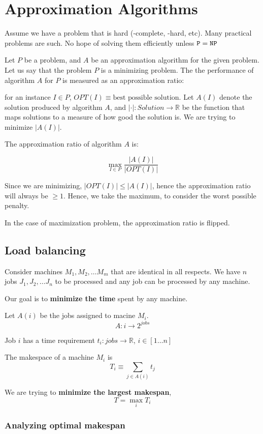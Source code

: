 \chapter{Approximation Algorithms}

Assume we have a problem that is hard (\nptime-complete, \nptime-hard, etc). Many practical
problems are such. No hope of solving them efficiently unless $\texttt{P} = \texttt{NP}$

Let $P$ be a problem, and $A$ be an approximation algorithm for the given problem.
Let us say that the problem $P$ is a minimizing problem. The the performance of
algorithm $A$ for $P$ is measured as an approximation ratio:

for an instance $I \in P$, $OPT(I) \equiv \text{best possible solution}$.
Let $A(I)$ denote the solution produced by algorithm $A$, and $| \cdot |: Solution \to \mathbb{R}$ be
the function that maps solutions to a measure of how good the solution is.
We are trying to minimize $|A(I)|$.

The approximation ratio of algorithm $A$ is:

$$
\max_{I \in P} \frac{|A(I)|}{|OPT(I)|}
$$

Since we are minimizing, $|OPT(I)| \leq |A(I)|$, hence the approximation ratio
will always be $\geq 1$. Hence, we take the maximum, to consider the worst
possible penalty.

In the case of maximization problem, the approximation ratio is flipped.

\section{Load balancing}

Consider machines $M_1, M_2, \dots M_m$ that are identical in all respects.
We have $n$ jobs $J_1, J_2, \dots J_n$ to be processed and any job can 
be processed by any machine.

Our goal is to \textbf{minimize the time} spent by any machine.


Let $A(i)$ be the jobs assigned to macine $M_i$. $$A: i \to 2^{jobs}$$

Job $i$ has a time requirement $t_i: jobs \to \mathbb{R}$, $i \in [1\dots n]$

The makespace of a machine $M_i$ is $$T_i \equiv \sum_{j \in A(i)} t_j$$

We are trying to \textbf{minimize the largest makespan},
$$
T = \max_i T_i
$$

\subsection{Analyzing optimal makespan}

